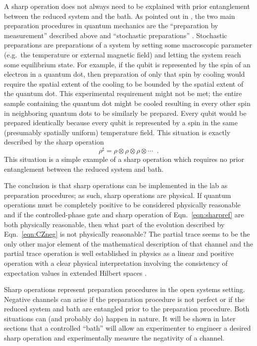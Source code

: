 A sharp operation does not always need to be explained with prior entanglement between the reduced system and the bath.  As pointed out in \cite{Sudarshen2007}, the two main preparation procedures in quantum mechanics are the ``preparation by measurement'' described above and ``stochastic preparations'' \cite{Sudarshen2007}.  Stochastic preparations are preparations of a system by setting some macroscopic parameter (e.g.\ the temperature or external magnetic field) and letting the system reach some equilibrium state.  For example, if the qubit is represented by the spin of an electron in a quantum dot, then preparation of only that spin by cooling would require the spatial extent of the cooling to be bounded by the spatial extent of the quantum dot.  This experimental requirement might not be met; the entire sample containing the quantum dot might be cooled resulting in every other spin in neighboring quantum dots to be similarly be prepared.  Every qubit would be prepared identically because every qubit is represented by a spin in the same (presumably spatially uniform) temperature field.  This situation is exactly described by the sharp operation
$$
\rho^\sharp = \rho\otimes\rho\otimes\rho\otimes\cdots\;\;.
$$
This situation is a simple example of a sharp operation which requires no prior entanglement between the reduced system and bath.

The conclusion is that sharp operations can be implemented in the lab as preparation procedures; as such, sharp operations are physical.  If quantum operations must be completely positive to be considered physically reasonable and if the controlled-phase gate and sharp operation of Eqn.\ \ref{eqn:sharpref} are both physically reasonable, then what part of the evolution described by Eqn.\ \ref{eqn:CZneg} is not physically reasonable?  The partial trace seems to be the only other major element of the mathematical description of that channel and the partial trace operation is well established in physics as a linear and positive operation \cite{Carlen2010} with a clear physical interpretation involving the consistency of expectation values in extended Hilbert spaces \cite{Cohen1992}.

Sharp operations represent preparation procedures in the open systems setting.  Negative channels can arise if the preparation procedure is not perfect or if the reduced system and bath are entangled prior to the preparation procedure.  Both situations can (and probably do) happen in nature.  It will be shown in later sections that a controlled ``bath'' will allow an experimenter to engineer a desired sharp operation and experimentally measure the negativity of a channel.  
 
